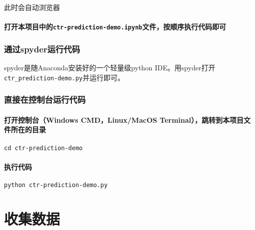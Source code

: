 \documentclass[11pt]{article}
\begin{document}
此时会自动浏览器

\paragraph{\texorpdfstring{打开本项目中的\texttt{ctr-prediction-demo.ipynb}文件，按顺序执行代码即可}{打开本项目中的ctr-prediction-demo.ipynb文件，按顺序执行代码即可}}\label{ux6253ux5f00ux672cux9879ux76eeux4e2dux7684ctr-prediction-demo.ipynbux6587ux4ef6ux6309ux987aux5e8fux6267ux884cux4ee3ux7801ux5373ux53ef}

    \subsubsection{通过spyder运行代码}\label{ux901aux8fc7spyderux8fd0ux884cux4ee3ux7801}

spyder是随Anaconda安装好的一个轻量级python
IDE。用spyder打开\texttt{ctr\_prediction-demo.py}并运行即可。

    \subsubsection{直接在控制台运行代码}\label{ux76f4ux63a5ux5728ux63a7ux5236ux53f0ux8fd0ux884cux4ee3ux7801}

\paragraph{打开控制台（Windows CMD，Linux/MacOS
Terminal），跳转到本项目文件所在的目录}\label{ux6253ux5f00ux63a7ux5236ux53f0windows-cmdlinuxmacos-terminalux8df3ux8f6cux5230ux672cux9879ux76eeux6587ux4ef6ux6240ux5728ux7684ux76eeux5f55}

\begin{verbatim}
cd ctr-prediction-demo
\end{verbatim}

\paragraph{执行代码}\label{ux6267ux884cux4ee3ux7801}

\begin{verbatim}
python ctr-prediction-demo.py
\end{verbatim}

    \section{收集数据}\label{ux6536ux96c6ux6570ux636e}
\end{document}
